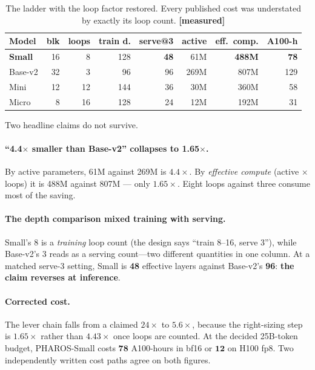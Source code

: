 \documentclass[11pt,a4paper]{article}
\newcommand{\meas}{\textcolor{measured}{\textbf{[measured]}}}
\begin{document}
\begin{table}[h]
\centering
\caption{The ladder with the loop factor restored. Every published cost was
understated by exactly its loop count. \meas}
\footnotesize
\setlength{\tabcolsep}{4pt}
\begin{tabular}{@{}lrrrrrrr@{}}
\toprule
\textbf{Model} & \textbf{blk} & \textbf{loops} & \textbf{train d.} & \textbf{serve@3} & \textbf{active} & \textbf{eff.\ comp.} & \textbf{A100-h} \\
\midrule
\textbf{Small} & 16 & 8 & 128 & \textbf{48} & 61M & \textbf{488M} & \textbf{78} \\
Base-v2 & 32 & 3 & 96 & 96 & 269M & 807M & 129 \\
Mini & 12 & 12 & 144 & 36 & 30M & 360M & 58 \\
Micro & 8 & 16 & 128 & 24 & 12M & 192M & 31 \\
\bottomrule
\end{tabular}
\end{table}

Two headline claims do not survive.

\paragraph{``4.4$\times$ smaller than Base-v2'' collapses to 1.65$\times$.} By
active parameters, 61M against 269M is $4.4\times$. By \emph{effective compute}
(active $\times$ loops) it is 488M against 807M --- only $\mathbf{1.65\times}$.
Eight loops against three consume most of the saving.

\paragraph{The depth comparison mixed training with serving.} Small's 8 is a
\emph{training} loop count (the design says ``train 8--16, serve 3''), while
Base-v2's 3 reads as a serving count---two different quantities in one column.
At a matched serve-3 setting, Small is \textbf{48} effective layers against
Base-v2's \textbf{96}: \textcolor{risk}{\textbf{the claim reverses at
inference}}.

\paragraph{Corrected cost.} The lever chain falls from a claimed $24\times$ to
$\mathbf{5.6\times}$, because the right-sizing step is $1.65\times$ rather than
$4.43\times$ once loops are counted. At the decided 25B-token budget,
PHAROS-Small costs $\mathbf{78}$ A100-hours in bf16 or $\mathbf{12}$ on H100
fp8. Two independently written cost paths agree on both figures.
\end{document}

